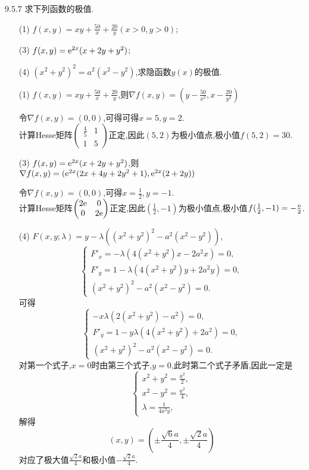 \begin{exercise}{9.5.7}
    求下列函数的极值.
    \begin{enumerate}
        \item[(1)] $f(x,y)=xy+\frac{50}{x}+\frac{20}{y}(x>0,y>0)$;
        \item[(3)] $f(x,y)=\mathrm{e}^{2x}(x+2y+y^2)$;
        \item[(4)] $(x^2+y^2)^2=a^2(x^2-y^2)$,求隐函数$y(x)$的极值.
    \end{enumerate}
\end{exercise}
\begin{solution}
    \begin{enumerate}
        \item[(1)] $f(x,y)=xy+\frac{50}{x}+\frac{20}{y}$,则$\nabla f(x,y)=(y-\frac{50}{x^2},x-\frac{20}{y^2})$
        
        令$\nabla f(x,y)=(0,0)$,可得可得$x=5,y=2$.\\
        计算Hesse矩阵$\begin{pmatrix}
            \frac{4}{5}&1\\
            1&5
        \end{pmatrix}$正定,因此$(5,2)$为极小值点,极小值$f(5,2)=30$.
        \item[(3)] $f(x,y)=\mathrm{e}^{2x}(x+2y+y^2)$,则$\nabla f(x,y)=(\mathrm{e}^{2x}(2x+4y+2y^2+1),\mathrm{e}^{2x}(2+2y))$
        
        令$\nabla f(x,y)=(0,0)$,可得$x=\frac{1}{2},y=-1$.\\
        计算Hesse矩阵$\begin{pmatrix}
            2\mathrm{e}&0\\
            0&2\mathrm{e}
        \end{pmatrix}$正定,因此$(\frac{1}{2},-1)$为极小值点,极小值$f(\frac{1}{2},-1)=-\frac{\mathrm{e}}{2}$.
        \item[(4)] $F(x,y;\lambda)=y-\lambda((x^2+y^2)^2-a^2(x^2-y^2))$,
        $$\begin{cases}
            F'_x=-\lambda(4(x^2+y^2)x-2a^2x)=0,\\
            F'_y=1-\lambda(4(x^2+y^2)y+2a^2y)=0,\\
            (x^2+y^2)^2-a^2(x^2-y^2)=0.
        \end{cases}$$
        可得
        $$\begin{cases}
            -x\lambda(2(x^2+y^2)-a^2)=0,\\
            F'_y=1-y\lambda(4(x^2+y^2)+2a^2)=0,\\
            (x^2+y^2)^2-a^2(x^2-y^2)=0.
        \end{cases}$$
        对第一个式子,$x=0$时由第三个式子,$y=0$,此时第二个式子矛盾,因此一定是
        $$\begin{cases}
            x^2+y^2=\frac{a^2}{2},\\
            x^2-y^2=\frac{a^2}{4},\\
            \lambda=\frac{1}{4a^2y},
        \end{cases}$$
        解得
        $$(x,y)=\left(\pm\frac{\sqrt{6}a}{4},\pm\frac{\sqrt{2}a}{4}\right)$$
        对应了极大值$\frac{\sqrt{2}a}{4}$和极小值$-\frac{\sqrt{2}a}{4}$.
    \end{enumerate}
\end{solution}

